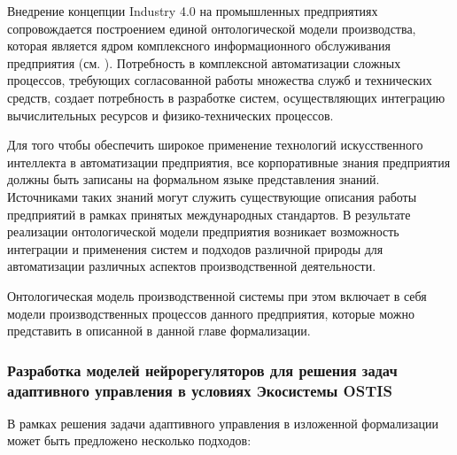 Внедрение концепции Industry 4.0 на промышленных предприятиях сопровождается построением единой онтологической модели производства, которая является ядром комплексного информационного обслуживания предприятия (см. ). Потребность в комплексной автоматизации сложных процессов, требующих согласованной работы множества служб и технических средств, создает потребность в разработке систем, осуществляющих интеграцию вычислительных ресурсов и физико-технических процессов.

Для того чтобы обеспечить широкое применение технологий искусственного интеллекта в автоматизации предприятия, все корпоративные знания предприятия должны быть записаны на формальном языке представления знаний. Источниками таких знаний могут служить существующие описания работы предприятий в рамках принятых международных стандартов. В результате реализации онтологической модели предприятия возникает возможность интеграции и применения систем и подходов различной природы для автоматизации различных аспектов производственной деятельности.

Онтологическая модель производственной системы при этом включает в себя модели производственных процессов данного предприятия, которые можно представить в описанной в данной главе формализации. 


\subsubsection{Разработка моделей нейрорегуляторов для решения задач адаптивного управления в условиях Экосистемы OSTIS}
\label{sec_chapter_enterprise_neuroregulators}


В рамках решения задачи адаптивного управления в изложенной формализации может быть предложено несколько подходов:

